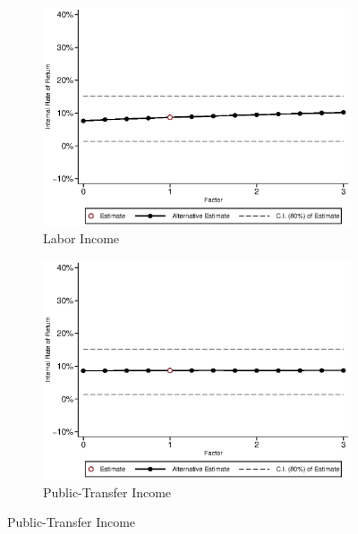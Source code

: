\begin{figure}[H]
\caption{Internal Rate of Return vs.~Components, Females} \label{fig:irrf_factor_f}
	
	\begin{subfigure}[h]{0.8\textwidth}
	\centering
	\caption{Labor Income} \label{fig:irrf_inc_labor_f1}
	\includegraphics[width=\textwidth]{AppOutput/Sensitivity/irrf_inc_labor_f1.eps}
	\end{subfigure}
	
	\begin{subfigure}[h]{0.8\textwidth}
	\centering
	\caption{Public-Transfer Income} \label{fig:irrf_transfer_f1}
	\includegraphics[width=\textwidth]{AppOutput/Sensitivity/irrf_transfer_f1.eps}
	\end{subfigure}
\end{figure}

